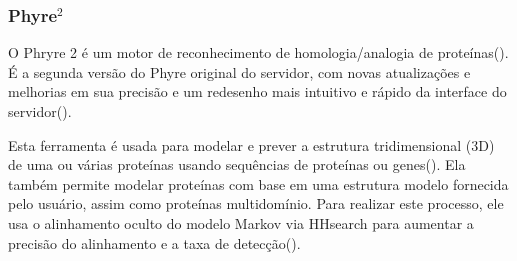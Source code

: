 \documentclass[11pt, letterpaper, portuguese]{article}
\begin{document}
        \subsubsection{Phyre\texorpdfstring{$^2$}{Lg}}
        \par{O Phryre 2 é um motor de reconhecimento de homologia/analogia de proteínas(). É a segunda versão do Phyre original do servidor, com novas atualizações e melhorias em sua precisão e um redesenho mais intuitivo e rápido da interface do servidor().} 
        \par{Esta ferramenta é usada para modelar e prever a estrutura tridimensional (3D) de uma ou várias proteínas usando sequências de proteínas ou genes(). Ela também permite modelar proteínas com base em uma estrutura modelo fornecida pelo usuário, assim como proteínas multidomínio. Para realizar este processo, ele usa o alinhamento oculto do modelo Markov via HHsearch para aumentar a precisão do alinhamento e a taxa de detecção().}  
        
\end{document}
